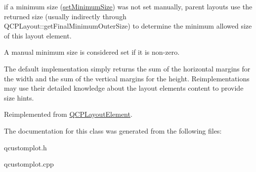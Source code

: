 if a minimum size (\hyperlink{classQCPLayoutElement_a5dd29a3c8bc88440c97c06b67be7886b}{set\+Minimum\+Size}) was not set manually, parent layouts use the returned size (usually indirectly through Q\+C\+P\+Layout\+::get\+Final\+Minimum\+Outer\+Size) to determine the minimum allowed size of this layout element.

A manual minimum size is considered set if it is non-\/zero.

The default implementation simply returns the sum of the horizontal margins for the width and the sum of the vertical margins for the height. Reimplementations may use their detailed knowledge about the layout element\textquotesingle{}s content to provide size hints. 

Reimplemented from \hyperlink{classQCPLayoutElement_a4c540ba5c686a1494c92c466912e5411}{Q\+C\+P\+Layout\+Element}.



The documentation for this class was generated from the following files\+:\begin{DoxyCompactItemize}
\item 
qcustomplot.\+h\item 
qcustomplot.\+cpp\end{DoxyCompactItemize}

